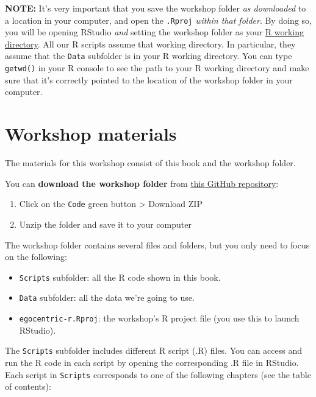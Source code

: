 \documentclass[
]{book}
\providecommand{\tightlist}{%
  \setlength{\itemsep}{0pt}\setlength{\parskip}{0pt}}
\begin{document}
\textbf{NOTE:} It's very important that you save the workshop folder \emph{as downloaded} to a location in your computer, and open the \texttt{.Rproj} \emph{within that folder}. By doing so, you will be opening RStudio \emph{and} setting the workshop folder as your \protect\hyperlink{starting-R-and-loading-packages}{R working directory}. All our R scripts assume that working directory. In particular, they assume that the \texttt{Data} subfolder is in your R working directory. You can type \texttt{getwd()} in your R console to see the path to your R working directory and make sure that it's correctly pointed to the location of the workshop folder in your computer.

\hypertarget{materials}{%
\section{Workshop materials}\label{materials}}

The materials for this workshop consist of this book and the workshop folder.

You can \textbf{download the workshop folder} from \href{https://github.com/raffaelevacca/egocentric-r-book}{this GitHub repository}:

\begin{enumerate}
\def\labelenumi{\arabic{enumi}.}
\tightlist
\item
  Click on the \texttt{Code} green button \textgreater{} Download ZIP
\item
  Unzip the folder and save it to your computer
\end{enumerate}

The workshop folder contains several files and folders, but you only need to focus on the following:

\begin{itemize}
\tightlist
\item
  \texttt{Scripts} subfolder: all the R code shown in this book.
\item
  \texttt{Data} subfolder: all the data we're going to use.
\item
  \texttt{egocentric-r.Rproj}: the workshop's R project file (you use this to launch RStudio).
\end{itemize}

The \texttt{Scripts} subfolder includes different R script (.R) files. You can access and run the R code in each script by opening the corresponding .R file in RStudio. Each script in \texttt{Scripts} corresponds to one of the following chapters (see the table of contents):
\end{document}
